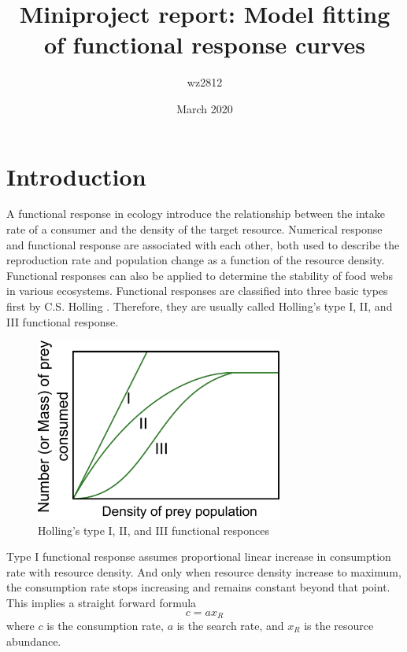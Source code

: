 \documentclass{article}[11pt,a4,twosided,doublespacing,titlepagenumber=on,numbers=endperiod]
\title{Miniproject report: Model fitting of functional response curves}
\author{wz2812 }
\date{March 2020}
\begin{document}
\maketitle

\newpage

\renewcommand{\contentsname}{Table of Contents}
\tableofcontents
\newpage

\section{Introduction}
\doublespacing
A functional response in ecology introduce the relationship between the intake rate of a consumer and the density of the target resource. Numerical response and functional response are associated with each other, both used to describe the reproduction rate and population change as a function of the resource density. Functional responses can also be applied to determine the stability of food webs in various ecosystems. Functional responses are classified into three basic types first by C.S. Holling \cite{holling1959components}. Therefore, they are usually called Holling's type I, II, and III functional response.
\begin{figure}[H]
\centering
\includegraphics[height= 60mm]{../Data/FR.pdf}
\renewcommand\thefigure{\arabic{figure}}
\setcounter{figure}{0}
\caption{Holling's type I, II, and III functional responces}
\end{figure}
\noindent Type I functional response assumes proportional linear increase in consumption rate with resource density. And only when resource density increase to maximum, the consumption rate stops increasing and remains constant beyond that point. This implies a straight forward formula
\begin{equation}
    c = a x_R
\end{equation}
where $c$ is the consumption rate, $a$ is the search rate, and $x_R$ is the resource abundance.\\
\end{document}
